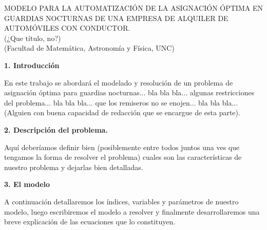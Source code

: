 \documentclass[12pt]{article}
\begin{document}
\begin{center}
 {\large MODELO PARA LA AUTOMATIZACIÓN DE LA ASIGNACIÓN ÓPTIMA EN GUARDIAS NOCTURNAS DE UNA EMPRESA DE ALQUILER DE AUTOMÓVILES CON CONDUCTOR.\\
 (¿Que título, no?)}\\
(Facultad de Matem\'atica, Astronom\'ia y F\'isica, UNC)
\vspace{0.5cm}\\
\end{center}


{\large\textbf{1. Introducci\'on}}

En este trabajo se abordará el modelado y resolución de un problema de asignación óptima para guardias nocturnas... bla bla bla...  algunas restricciones del problema... bla bla bla... que los remiseros no se enojen... bla bla bla...
(Alguien con buena capacidad de redacción que se encargue de esta parte).

{\large\textbf{2. Descripción del problema.}}

Aquí deberíamos definir bien (posiblemente entre todos juntos una ves que tengamos la forma de resolver el problema) cuales son las características de nuestro problema y dejarlas bien detalladas.

{\large\textbf{3. El modelo}}

A continuación detallaremos los índices, variables y parámetros de nuestro modelo, luego escribiremos el modelo a resolver y finalmente desarrollaremos una breve explicación de las ecuaciones que lo constituyen.
\end{document}

